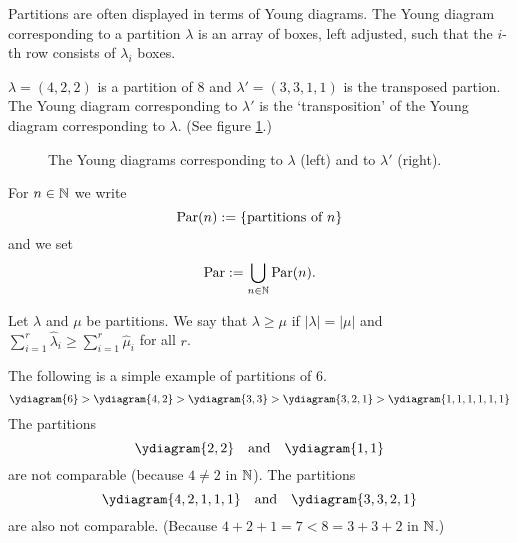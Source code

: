 Partitions are often displayed in terms of Young diagrams. The Young diagram corresponding to a partition $\lambda$ is an array of boxes, left adjusted, such that the $i$-th row consists of $\lambda_i$ boxes.


\begin{expl}
 $\lambda = (4,2,2)$ is a partition of $8$ and $\lambda' = (3,3,1,1)$ is the transposed partion. The Young diagram corresponding to $\lambda'$ is the `transposition' of the Young diagram corresponding to $\lambda$. (See figure \ref{fig: Young diagram example}.)
 \begin{figure}
  \centering
  \qquad
  \caption{The Young diagrams corresponding to $\lambda$ (left) and to $\lambda'$ (right).}
  \label{fig: Young diagram example}
 \end{figure}
\end{expl}


\begin{defi}
 For $n \in \mathbb{N}$ we write
 \[
  \operatorname{Par}(n) := \{\text{partitions of $n$}\}
 \]
 and we set
 \[
  \operatorname{Par} := \bigcup_{n \in \mathbb{N}} \operatorname{Par}(n).
 \]
\end{defi}
 

\begin{defi}
 Let $\lambda$ and $\mu$ be partitions. We say that $\lambda \geq \mu$ if $|\lambda| = |\mu|$ and $\sum_{i=1}^r \hat{\lambda}_i \geq \sum_{i=1}^r \hat{\mu}_i$ for all $r$.
\end{defi}


\begin{expls}
 The following is a simple example of partitions of $6$.
 \[
  \ydiagram{6} > \ydiagram{4,2} > \ydiagram{3,3} > \ydiagram{3,2,1} > \ydiagram{1,1,1,1,1,1}
 \]
 The partitions
 \[
  \ydiagram{2,2} \quad \text{and} \quad \ydiagram{1,1}
 \]
 are not comparable (because $4 \neq 2$ in $\mathbb{N}$). The partitions
 \[
  \ydiagram{4,2,1,1,1} \quad \text{and} \quad \ydiagram{3,3,2,1}
 \]
 are also not comparable. (Because $4+2+1 = 7 < 8 = 3+3+2$ in $\mathbb{N}$.)
\end{expls}

